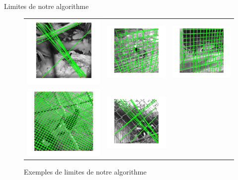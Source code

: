 \begin{frame}{Limites de notre algorithme}
\begin{figure}
\centering
\begin{tabular}{ccc}
\includegraphics[width = 0.25\columnwidth]{fig/flou.png} &
\includegraphics[width = 0.25\columnwidth]{fig/double.png} &
\includegraphics[width = 0.25\columnwidth]{fig/partiel.png}\\
\includegraphics[width = 0.25\columnwidth]{fig/deform.png}&
\includegraphics[width = 0.25\columnwidth]{fig/croisillons.png}
\end{tabular}
\caption{\label{badones}Exemples de limites de notre algorithme}
\end{figure}

\end{frame}
